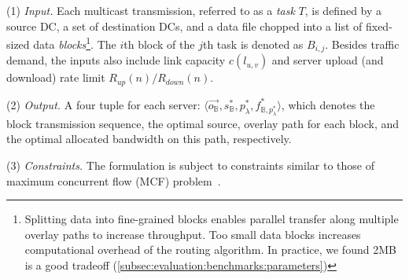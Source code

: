 
\noindent(1) {\em Input.}%
Each multicast transmission, referred to as a {\em task} $T$, is defined
by a source DC, a set of destination DCs, and a data file chopped into
a list of fixed-sized data
{\em blocks}\footnote{Splitting data into fine-grained blocks enables
parallel transfer along
multiple overlay paths to increase throughput. Too small data blocks
increases computational overhead of the routing algorithm.
In practice, we found 2MB is a good tradeoff
(\Section\ref{subsec:evaluation:benchmarks:parameters})}.
The $i$th block of the $j$th task is denoted as $B_{i,j}$.
Besides traffic demand, the inputs also include link capacity $c(l_{u,v})$ and
server upload (and download) rate limit $R_{up}(n)/R_{down}(n)$. %

\noindent(2) {\em Output.} A four tuple for each server: $\langle \overrightarrow{o_\mathbb{B}}, s_{\mathbb{B}}^*, p_{\lambda}^*, f^*_{\mathbb{B},p_{\lambda}^*} \rangle$, which denotes the block transmission sequence, the optimal source, overlay path for each block, and the optimal allocated bandwidth on this path, respectively. %

\noindent(3) {\em Constraints.}
The formulation is subject to constraints similar to those of maximum concurrent flow (MCF) problem~\cite{garg2007faster}.%

